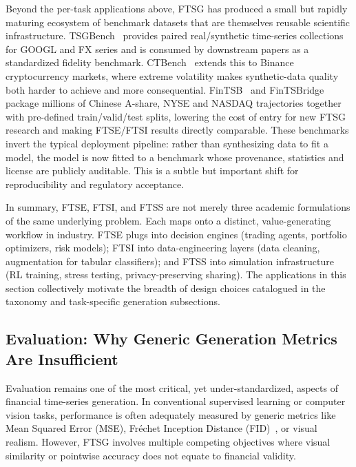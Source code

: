 \documentclass[11pt,a4paper]{article}
\begin{document}
Beyond the per-task applications above, FTSG has produced a small but
rapidly maturing ecosystem of benchmark datasets that are themselves
reusable scientific infrastructure. TSGBench~\citep{ang2023tsgbench}
provides paired real/synthetic time-series collections for GOOGL and FX
series and is consumed by downstream papers as a standardized fidelity
benchmark. CTBench~\citep{ang2025ctbench} extends this to Binance
cryptocurrency markets, where extreme volatility makes synthetic-data
quality both harder to achieve and more consequential.
FinTSB~\citep{hu2025fintsb} and FinTSBridge~\citep{wang2025fintsbridge}
package millions of Chinese A-share, NYSE and NASDAQ trajectories
together with pre-defined train/valid/test splits, lowering the cost of
entry for new FTSG research and making FTSE/FTSI results directly
comparable. These benchmarks invert the typical deployment pipeline:
rather than synthesizing data to fit a model, the model is now fitted
to a benchmark whose provenance, statistics and license are publicly
auditable. This is a subtle but important shift for reproducibility and
regulatory acceptance.

In summary, FTSE, FTSI, and FTSS are not merely three academic
formulations of the same underlying problem. Each maps onto a
distinct, value-generating workflow in industry. FTSE plugs into
decision engines (trading agents, portfolio optimizers, risk models);
FTSI into data-engineering layers (data cleaning, augmentation for
tabular classifiers); and FTSS into simulation infrastructure (RL
training, stress testing, privacy-preserving sharing). The applications
in this section collectively motivate the breadth of design choices
catalogued in the taxonomy and task-specific generation subsections.


\subsection{Evaluation: Why Generic Generation Metrics Are Insufficient}
\label{sec:evaluation}

Evaluation remains one of the most critical, yet under-standardized, aspects of financial time-series generation. In conventional supervised learning or computer vision tasks, performance is often adequately measured by generic metrics like Mean Squared Error (MSE), Fréchet Inception Distance (FID)~\citep{heusel2017gans}, or visual realism. However, FTSG involves multiple competing objectives where visual similarity or pointwise accuracy does not equate to financial validity.
\end{document}
